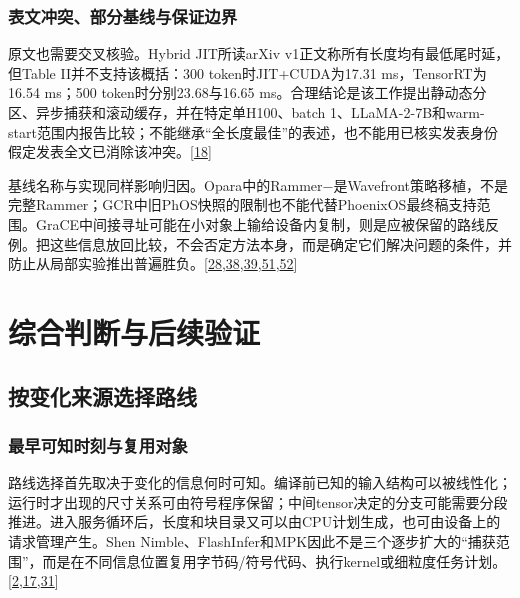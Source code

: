 \documentclass[
  UTF8,
  zihao=5]{ctexart}
\begin{document}
\hypertarget{ux8868ux6587ux51b2ux7a81ux90e8ux5206ux57faux7ebfux4e0eux4fddux8bc1ux8fb9ux754c}{%
\subsubsection{表文冲突、部分基线与保证边界}\label{ux8868ux6587ux51b2ux7a81ux90e8ux5206ux57faux7ebfux4e0eux4fddux8bc1ux8fb9ux754c}}

原文也需要交叉核验。Hybrid JIT所读arXiv
v1正文称所有长度均有最低尾时延，但Table II并不支持该概括：300
token时JIT+CUDA为17.31 ms，TensorRT为16.54 ms；500
token时分别23.68与16.65
ms。合理结论是该工作提出静动态分区、异步捕获和滚动缓存，并在特定单H100、batch
1、LLaMA-2-7B和warm-start范围内报告比较；不能继承``全长度最佳''的表述，也不能用已核实发表身份假定发表全文已消除该冲突。{[}\protect\hyperlink{ref-yadav2026hybridpreprint}{18}{]}

基线名称与实现同样影响归因。Opara中的Rammer−是Wavefront策略移植，不是完整Rammer；GCR中旧PhOS快照的限制也不能代替PhoenixOS最终稿支持范围。GraCE中间接寻址可能在小对象上输给设备内复制，则是应被保留的路线反例。把这些信息放回比较，不会否定方法本身，而是确定它们解决问题的条件，并防止从局部实验推出普遍胜负。{[}\protect\hyperlink{ref-ghosh2026grace}{28},\protect\hyperlink{ref-ma2020rammer}{38},\protect\hyperlink{ref-chen2025opara}{39},\protect\hyperlink{ref-wei2025phoenixos}{51},\protect\hyperlink{ref-zeng2026gcr}{52}{]}

\hypertarget{ux7efcux5408ux5224ux65adux4e0eux540eux7eedux9a8cux8bc1}{%
\section{综合判断与后续验证}\label{ux7efcux5408ux5224ux65adux4e0eux540eux7eedux9a8cux8bc1}}

\hypertarget{ux6309ux53d8ux5316ux6765ux6e90ux9009ux62e9ux8defux7ebf}{%
\subsection{按变化来源选择路线}\label{ux6309ux53d8ux5316ux6765ux6e90ux9009ux62e9ux8defux7ebf}}

\hypertarget{ux6700ux65e9ux53efux77e5ux65f6ux523bux4e0eux590dux7528ux5bf9ux8c61}{%
\subsubsection{最早可知时刻与复用对象}\label{ux6700ux65e9ux53efux77e5ux65f6ux523bux4e0eux590dux7528ux5bf9ux8c61}}

路线选择首先取决于变化的信息何时可知。编译前已知的输入结构可以被线性化；运行时才出现的尺寸关系可由符号程序保留；中间tensor决定的分支可能需要分段推进。进入服务循环后，长度和块目录又可以由CPU计划生成，也可由设备上的请求管理产生。Shen
Nimble、FlashInfer和MPK因此不是三个逐步扩大的``捕获范围''，而是在不同信息位置复用字节码/符号代码、执行kernel或细粒度任务计划。{[}\protect\hyperlink{ref-ye2025flashinfer}{2},\protect\hyperlink{ref-shen2021nimble}{17},\protect\hyperlink{ref-cheng2026mpk}{31}{]}
\end{document}
